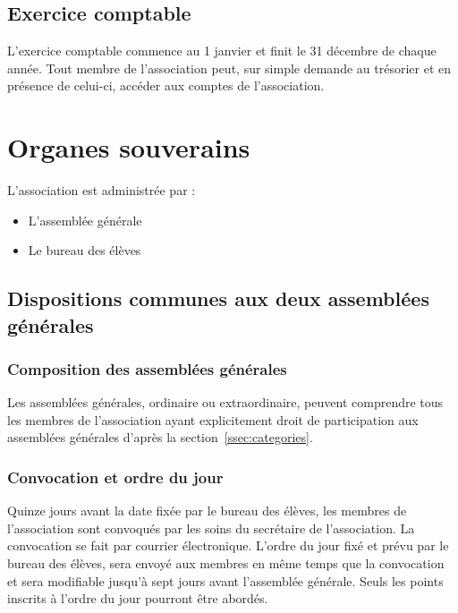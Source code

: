 \documentclass{article}
\begin{document}
		\subsection{Exercice comptable}
			L’exercice comptable commence au 1 janvier et finit le 31
			décembre de chaque année. Tout membre de l’association peut, sur
			simple demande au trésorier et en présence de celui-ci, accéder aux
			comptes de l’association.

	\section{Organes souverains}
		L’association est administrée par :
		\begin{itemize}
			\item L’assemblée générale
			\item Le bureau des élèves
		\end{itemize}

		\subsection{Dispositions communes aux deux assemblées générales}
			\subsubsection{Composition des assemblées générales}
				Les assemblées générales, ordinaire ou extraordinaire, peuvent
				comprendre tous les membres de l’association ayant explicitement
				droit de participation aux assemblées générales d'après la
				section~\ref{ssec:categories}.

			\subsubsection{Convocation et ordre du jour}
			\label{sssec:convocation}
				Quinze jours avant la date fixée par le bureau des élèves, les
				membres de l’association sont convoqués par les soins du
				secrétaire de l’association. La convocation se fait par courrier
				électronique. L’ordre du jour fixé et prévu par le bureau des
				élèves, sera envoyé aux membres en même temps que la convocation
				et sera modifiable jusqu’à sept jours avant l'assemblée
				générale. Seuls les points inscrits à l’ordre du jour pourront
				être abordés.
				
\end{document}

